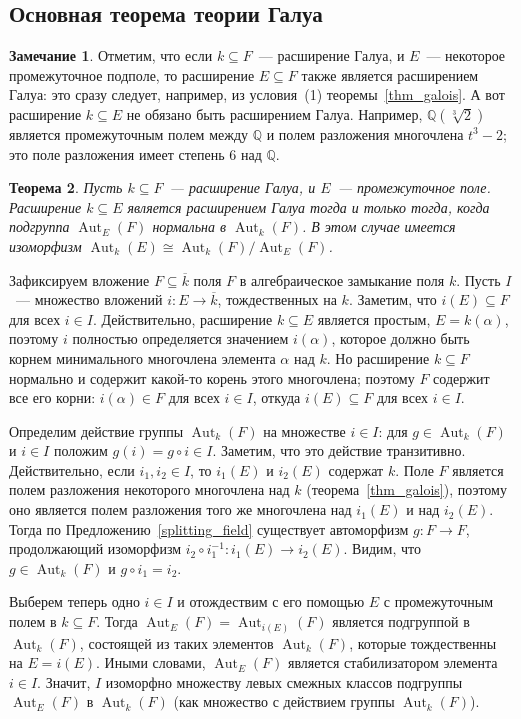 \documentclass[a4paper,11pt]{scrartcl}
\theoremstyle{plain}
\newtheorem{theorem}{Теорема}[subsection]
\theoremstyle{definition}
\newtheorem{remark}[theorem]{Замечание}
\newcommand\mb{\mathbb}
\newcommand\isom{\cong}
\newcommand\sseq{\subseteq}
\newcommand\Aut{\operatorname{Aut}}
\begin{document}
\subsection{Основная теорема теории Галуа}

\begin{remark}
Отметим, что если $k\sseq F$~--- расширение Галуа, и $E$~---
некоторое промежуточное подполе, то расширение
$E\sseq F$ также является расширением Галуа:
это сразу следует, например, из условия~(1)
теоремы~\ref{thm_galois}.
А вот расширение $k\sseq E$ не обязано быть
расширением Галуа.
Например, $\mb Q(\sqrt[3]{2})$ является
промежуточным полем между $\mb Q$ и полем разложения многочлена
$t^3-2$; это поле разложения имеет степень $6$ над $\mb Q$.
\end{remark}

\begin{theorem}\label{thm_galois_normal}
Пусть $k\sseq F$~--- расширение Галуа, и $E$~--- промежуточное
поле. Расширение $k\sseq E$ является расширением Галуа тогда и только
тогда, когда подгруппа $\Aut_E(F)$ нормальна в $\Aut_k(F)$. В этом
случае имеется изоморфизм $\Aut_k(E)\isom\Aut_k(F)/\Aut_E(F)$.
\end{theorem}
Зафиксируем вложение $F\sseq\overline{k}$ поля $F$ в алгебраическое
замыкание поля $k$. Пусть $I$~--- множество вложений $i\colon
E\to\overline{k}$, тождественных на $k$. Заметим, что $i(E)\sseq F$
для всех $i\in I$. Действительно, расширение $k\sseq E$ является
простым, $E=k(\alpha)$, поэтому $i$ полностью определяется значением
$i(\alpha)$, которое должно быть корнем минимального многочлена
элемента $\alpha$ над $k$.
Но расширение $k\sseq F$ нормально и содержит какой-то
корень этого многочлена; поэтому $F$ содержит все его корни:
$i(\alpha)\in F$ для всех $i\in I$, откуда $i(E)\sseq F$ для всех
$i\in I$.

Определим действие группы $\Aut_k(F)$ на множестве $i\in I$: для
$g\in\Aut_k(F)$ и $i\in I$ положим $g(i)=g\circ i\in I$. Заметим, что
это действие транзитивно. Действительно, если $i_1,i_2\in I$, то
$i_1(E)$ и $i_2(E)$ содержат $k$. Поле $F$ является полем разложения
некоторого многочлена над $k$ (теорема~\ref{thm_galois}), поэтому оно
является полем разложения того же многочлена над $i_1(E)$ и над
$i_2(E)$. Тогда по Предложению~\ref{splitting_field} существует
автоморфизм $g\colon F\to F$, продолжающий изоморфизм $i_2\circ
i_1^{-1}\colon i_1(E)\to i_2(E)$. Видим, что $g\in\Aut_k(F)$ и $g\circ
i_1=i_2$.

Выберем теперь одно $i\in I$ и отождествим с его помощью $E$ с
промежуточным полем в $k\sseq F$. Тогда $\Aut_E(F)=\Aut_{i(E)}(F)$
является подгруппой в $\Aut_k(F)$, состоящей из таких элементов
$\Aut_k(F)$, которые тождественны на $E=i(E)$. Иными словами,
$\Aut_E(F)$ является стабилизатором элемента $i\in I$.
Значит, $I$ изоморфно множеству левых смежных классов подгруппы
$\Aut_E(F)$ в $\Aut_k(F)$ (как множество с действием группы
$\Aut_k(F)$).
\end{document}
